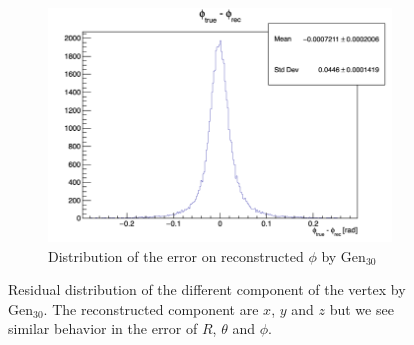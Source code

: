\documentclass[../main.tex]{subfiles}
\begin{document}
{{\begin{figure}[ht]
\begin{subfigure}[t]{0.32\linewidth}
    \includegraphics[width=\linewidth]{images/jcnn/vic_cnn/cnn_delta_phi.png}
    \caption{Distribution of the error on reconstructed $\phi$ by $\mathrm{Gen}_{30}$}
    \label{fig:jcnn:vic_cnn:cnn_delta_phi}
  \end{subfigure}
  \caption{Residual distribution of the different component of the vertex by $\mathrm{Gen}_{30}$. The reconstructed component are $x$, $y$ and $z$ but we see similar behavior in the error of $R$, $\theta$ and $\phi$.}
  \label{fig:jcnn:vic_cnn:cnn_perf}
\end{figure}


}}
\end{document}
